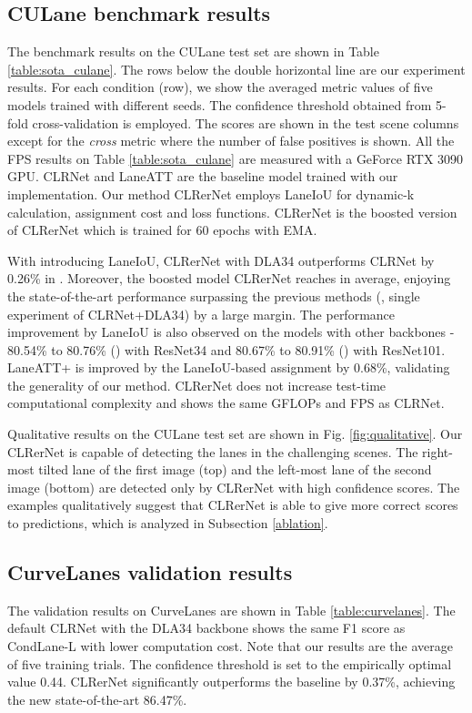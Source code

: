 \documentclass[10pt,twocolumn,letterpaper]{article}
\begin{document}
\subsection{CULane benchmark results}
The benchmark results on the CULane test set are shown in Table \ref{table:sota_culane}. 
The rows below the double horizontal line are our experiment results. 
For each condition (row), we show the averaged metric values of five models trained with different seeds.
The confidence threshold obtained from 5-fold cross-validation is employed. 
The  scores are shown in the test scene columns except for the \textit{cross} metric where the number of false positives is shown.
All the FPS results on Table \ref{table:sota_culane} are measured with a GeForce RTX 3090 GPU.
CLRNet and LaneATT are the baseline model trained with our implementation.
Our method CLRerNet employs LaneIoU for dynamic-k calculation, assignment cost and loss functions. CLRerNet is the boosted version of CLRerNet which is trained for 60 epochs with EMA.

With introducing LaneIoU, CLRerNet with DLA34 outperforms CLRNet by 0.26\% in . Moreover, the boosted model CLRerNet reaches  in average, enjoying the state-of-the-art performance surpassing the previous methods (, single experiment of CLRNet+DLA34) by a large margin.
The performance improvement by LaneIoU is also observed on the models with other backbones - 80.54\% to 80.76\% () with ResNet34 and 80.67\% to 80.91\% () with ResNet101.
LaneATT+ is improved by the LaneIoU-based assignment by 0.68\%, validating the generality of our method.
CLRerNet does not increase test-time computational complexity and shows the same GFLOPs and FPS as CLRNet.

Qualitative results on the CULane test set are shown in Fig. \ref{fig:qualitative}. Our CLRerNet is capable of detecting the lanes in the challenging scenes. 
The right-most tilted lane of the first image (top) and the left-most lane of the second image (bottom) are detected only by CLRerNet with high confidence scores.
The examples qualitatively suggest that CLRerNet is able to give more correct scores to predictions, which is analyzed in Subsection \ref{ablation}.


\subsection{CurveLanes validation results}
The validation results on CurveLanes are shown in Table \ref{table:curvelanes}.
The default CLRNet \cite{Zheng_2022_CVPR} with the DLA34 backbone shows the same F1 score as CondLane-L\cite{Liu_2021_ICCV} with lower computation cost. Note that our results are the average of five training trials. The confidence threshold is set to the empirically optimal value 0.44. CLRerNet significantly outperforms the baseline by 0.37\%, achieving the new state-of-the-art 86.47\%. 
\end{document}
